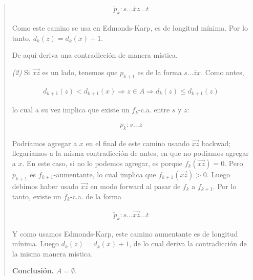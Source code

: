 \documentclass[a4paper]{article}
\begin{document}
\begin{quote}
\begin{align*} \widetilde{p}_k : s \ldots \overleftarrow{xz} \ldots t \end{align*}

Como este camino se usa en Edmonds-Karp, es de longitud mínima. Por lo tanto,
$d_k(z) = d_{k}(x) + 1$. 

De aquí deriva una contradicción de manera mística.

\textit{(2)} Si $\overrightarrow{xz}$ es un lado, tenemos que $p_{k+1}$ es de
la forma $s \ldots \overleftarrow{zx}$. Como antes, 

\begin{align*} d_{k+1}(z) < d_{k+1}(x) \Rightarrow z \in A \Rightarrow d_k(z)
\leq d_{k+1}(z) \end{align*}

lo cual a su vez implica que existe un $f_k$-c.a. entre $s$ y $z$: 

\begin{align*} p_k : s \ldots z \end{align*}

Podríamos agregar a $x$ en el final de este camino usando $\overrightarrow{xz}$
backwad; llegaríamos a la misma contradicción de antes, en que no podíamos
agregar a $x$. En este caso, si no lo podemos agregar, es porque
$f_k(\overrightarrow{xz}) = 0$. Pero $p_{k+1}$ es $f_{k+1}$-aumentante, lo cual
implica que $f_{k+1}(\overrightarrow{xz}) > 0$. Luego debimos haber usado
$\overrightarrow{xz}$ en modo forward al pasar de $f_k$ a $f_{k+1}$. Por lo
tanto, existe un $f_k$-c.a. de la forma 

\begin{align*} \widetilde{p}_k : s \ldots \overrightarrow{xz} \ldots t \end{align*}

Y como usamos Edmonds-Karp, este camino aumentante es de longitud mínima. Luego
$d_k(z) = d_{k}(x) + 1$, de lo cual deriva la contradicción de la misma manera
mística.

\textbf{Conclusión.} $A = \emptyset$.


\end{quote}
\normalsize
\end{document}
